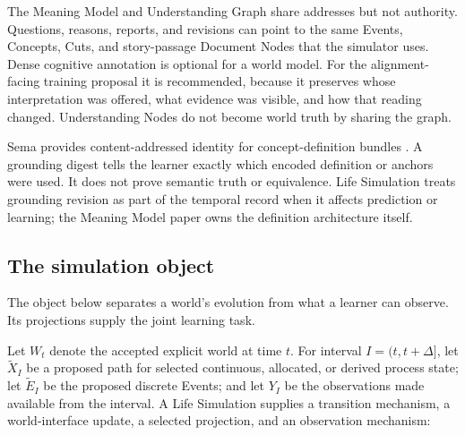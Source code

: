 \documentclass[10pt]{article}
\begin{document}
The Meaning Model and Understanding Graph share addresses but not authority.
Questions, reasons, reports, and revisions can point to the same Events,
Concepts, Cuts, and story-passage Document Nodes that the simulator uses. Dense cognitive
annotation is optional for a world model. For the alignment-facing training
proposal it is recommended, because it preserves whose interpretation was
offered, what evidence was visible, and how that reading changed. Understanding Nodes
do not become world truth by sharing the graph.

Sema provides content-addressed identity for concept-definition bundles
\cite{westerbergSema2026}. A grounding digest tells the learner exactly which
encoded definition or anchors were used. It does not prove semantic truth or
equivalence. Life Simulation treats grounding revision as part of the temporal
record when it affects prediction or learning; the Meaning Model paper owns the
definition architecture itself.

\subsection{The simulation object}

The object below separates a world's evolution from what a learner can
observe. Its projections supply the joint learning task.

Let $W_t$ denote the accepted explicit world at time $t$. For interval
$I=(t,t+\Delta]$, let $\widetilde X_I$ be a proposed path for selected
continuous, allocated, or derived process state; let $\widetilde E_I$ be the
proposed discrete Events; and let $Y_I$ be the observations made available from
the interval. A Life Simulation supplies a transition mechanism, a
world-interface update, a selected projection, and an observation mechanism:
\end{document}
